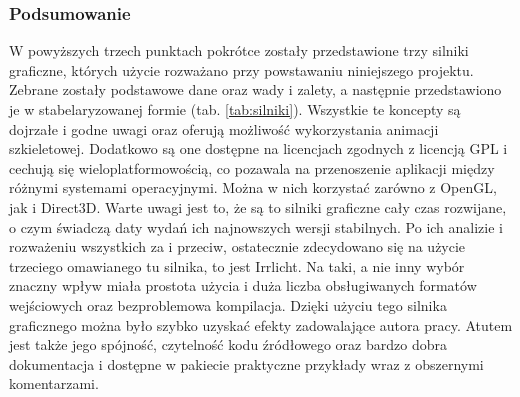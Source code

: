 \documentclass[11pt]{mwrep}
\begin{document}
      \subsubsection{Podsumowanie}

      W powyższych trzech punktach pokrótce zostały przedstawione trzy silniki graficzne, których użycie rozważano przy powstawaniu niniejszego projektu. Zebrane zostały podstawowe dane oraz wady i zalety, a następnie przedstawiono je w stabelaryzowanej formie (tab. \ref{tab:silniki}). Wszystkie te koncepty są dojrzałe i godne uwagi oraz oferują możliwość wykorzystania animacji szkieletowej. Dodatkowo są one dostępne na licencjach zgodnych z licencją GPL i cechują się wieloplatformowością, co pozawala na przenoszenie aplikacji między różnymi systemami operacyjnymi. Można w nich korzystać zarówno z OpenGL, jak i Direct3D. Warte uwagi jest to, że są to silniki graficzne cały czas rozwijane, o czym świadczą daty wydań ich najnowszych wersji stabilnych. Po ich analizie i rozważeniu wszystkich za i przeciw, ostatecznie zdecydowano się na użycie trzeciego omawianego tu silnika, to jest Irrlicht. Na taki, a nie inny wybór znaczny wpływ miała prostota użycia i duża liczba obsługiwanych formatów wejściowych oraz bezproblemowa kompilacja. Dzięki użyciu tego silnika graficznego można było szybko uzyskać efekty zadowalające autora pracy. Atutem jest także jego spójność, czytelność kodu źródłowego oraz bardzo dobra dokumentacja i dostępne w pakiecie praktyczne przykłady wraz z obszernymi komentarzami.
\end{document}
